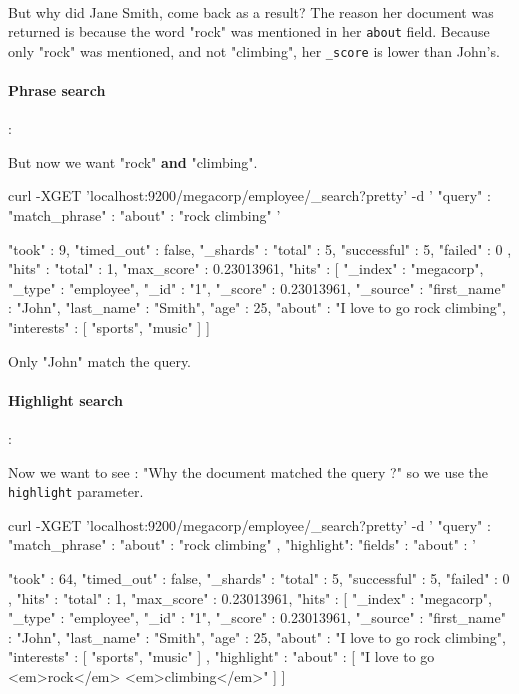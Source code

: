 \documentclass{article}%
\begin{document}
\paragraph{} But why did Jane Smith, come back as a result? The reason her document was returned is because the word "rock" was mentioned in her \texttt{about} field. Because only "rock" was mentioned, and not "climbing", her \texttt{\_score} is lower than John’s.

\paragraph{Phrase search}:

But now we want "rock" \textbf{and} "climbing".

\begin{command}
curl -XGET 'localhost:9200/megacorp/employee/_search?pretty' -d '
{
    "query" : {
        "match_phrase" : {
            "about" : "rock climbing"
        }
    }
}'
\end{command}

\begin{command}
{
	"took" : 9,
	"timed_out" : false,
	"_shards" : {
		"total" : 5,
		"successful" : 5,
		"failed" : 0
	},
	"hits" : {
		"total" : 1,
		"max_score" : 0.23013961,
		"hits" : [ {
			"_index" : "megacorp",
			"_type" : "employee",
			"_id" : "1",
			"_score" : 0.23013961,
			"_source" : {
				"first_name" : "John",
				"last_name"  : "Smith",
				"age"        : 25,
				"about"      : "I love to go rock climbing",
				"interests"  : [ "sports", "music" ]
			}
		} ]
	}
}
\end{command}

Only "John" match the query.

\paragraph{Highlight search}:

Now we want to see : "Why the document matched the query ?" so we use the \texttt{highlight} parameter.

\begin{command}
curl -XGET 'localhost:9200/megacorp/employee/_search?pretty' -d '
{
	"query" : {
		"match_phrase" : {
			"about" : "rock climbing"
		}
	},
	"highlight": {
		"fields" : {
			"about" : {}
		}
	}
}'
\end{command}

\begin{command}
{
	"took" : 64,
	"timed_out" : false,
	"_shards" : {
		"total" : 5,
		"successful" : 5,
		"failed" : 0
	},
	"hits" : {
		"total" : 1,
		"max_score" : 0.23013961,
		"hits" : [ {
			"_index" : "megacorp",
			"_type" : "employee",
			"_id" : "1",
			"_score" : 0.23013961,
			"_source" : {
				"first_name" : "John",
				"last_name"  : "Smith",
				"age"        : 25,
				"about"      : "I love to go rock climbing",
				"interests"  : [ "sports", "music" ]
			},
			"highlight" : {
				"about" : [ "I love to go <em>rock</em> <em>climbing</em>" ]
			}
		} ]
	}
}
\end{command}
\end{document}
